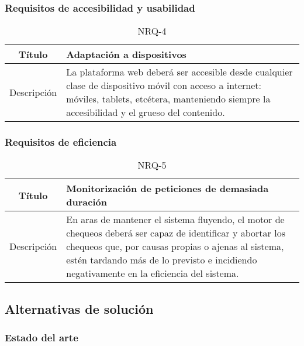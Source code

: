 \FloatBarrier
\subsubsection{Requisitos de accesibilidad y usabilidad}

\begin{table}[h!]
  \centering
  \begin{tabularx}{\textwidth}{|c|X|}
    \hline
    Título & Adaptación a dispositivos \\

    \hline

    Descripción & La plataforma web deberá ser accesible desde cualquier clase
    de dispositivo móvil con acceso a internet: móviles, tablets, etcétera,
    manteniendo siempre la accesibilidad y el grueso del contenido. \\

    \hline
  \end{tabularx}
  \caption{NRQ-4}
\end{table}


\FloatBarrier
\subsubsection{Requisitos de eficiencia}

\begin{table}[H]
  \centering
  \begin{tabularx}{\textwidth}{|c|X|}
    \hline
    Título & Monitorización de peticiones de demasiada duración \\

    \hline

    Descripción & En aras de mantener el sistema fluyendo, el motor de chequeos
    deberá ser capaz de identificar y abortar los chequeos que, por causas
    propias o ajenas al sistema, estén tardando más de lo previsto e incidiendo
    negativamente en la eficiencia del sistema. \\

    \hline
  \end{tabularx}
  \caption{NRQ-5}
\end{table}

\subsection{Alternativas de solución}

\subsubsection{Estado del arte}

